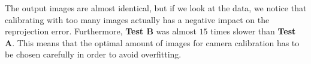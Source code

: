 \documentclass{article}
\begin{document}
The output images are almost identical, but if we look at the data, we notice that calibrating with too many images actually has a negative impact on the reprojection error. Furthermore, \textbf{Test B} was almost $15$ times slower than \textbf{Test A}.
This means that the optimal amount of images for camera calibration has to be chosen carefully in order to avoid overfitting.
\end{document}
